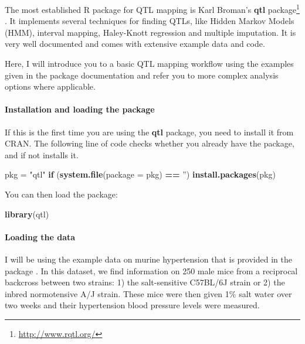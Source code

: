\documentclass[12pt,]{krantz}
\newenvironment{Shaded}{\begin{snugshade}}{\end{snugshade}}
\newcommand{\KeywordTok}[1]{\textcolor[rgb]{0.27,0.27,0.27}{\textbf{#1}}}
\newcommand{\DataTypeTok}[1]{\textcolor[rgb]{0.27,0.27,0.27}{#1}}
\newcommand{\StringTok}[1]{\textcolor[rgb]{0.5,0.5,0.5}{#1}}
\newcommand{\ControlFlowTok}[1]{\textcolor[rgb]{0.13,0.29,0.53}{\textbf{#1}}}
\newcommand{\OperatorTok}[1]{\textcolor[rgb]{0.81,0.36,0.00}{\textbf{#1}}}
\newcommand{\NormalTok}[1]{#1}
\let\oldparagraph\paragraph
\renewcommand{\paragraph}[1]{\oldparagraph{#1}\mbox{}}
\renewcommand{\href}[2]{#2\footnote{\url{#1}}}
\theoremstyle{definition}
\theoremstyle{definition}
\theoremstyle{definition}
\theoremstyle{remark}
\begin{document}
The most established R package for QTL mapping is Karl Broman's
\href{http://www.rqtl.org/}{\textbf{qtl} package}
\citep{R-qtl}. It implements several techniques for finding QTLs, like
Hidden Markov Models (HMM), interval mapping, Haley-Knott regression and
multiple imputation. It is very well documented and comes with extensive
example data and code.

Here, I will introduce you to a basic QTL mapping workflow using the
examples given in the package documentation and refer you to more
complex analysis options where applicable.

\paragraph{Installation and loading the
package}\label{installation-and-loading-the-package}

If this is the first time you are using the \textbf{qtl}
package, you need to install it from CRAN. The following line of code
checks whether you already have the package, and if not installs it.

\begin{Shaded}
\begin{Highlighting}[]
\NormalTok{pkg =}\StringTok{ "qtl"}
\ControlFlowTok{if}\NormalTok{ (}\KeywordTok{system.file}\NormalTok{(}\DataTypeTok{package =}\NormalTok{ pkg) }\OperatorTok{==}\StringTok{ ''}\NormalTok{) }\KeywordTok{install.packages}\NormalTok{(pkg)}
\end{Highlighting}
\end{Shaded}

You can then load the package:

\begin{Shaded}
\begin{Highlighting}[]
\KeywordTok{library}\NormalTok{(qtl)}
\end{Highlighting}
\end{Shaded}

\paragraph{Loading the data}\label{loading-the-data}

I will be using the example data on murine hypertension that is provided
in the package \citep{Sugiyama200170}. In this dataset, we find
information on 250 male mice from a reciprocal backcross between two
strains: 1) the salt-sensitive C57BL/6J strain or 2) the inbred
normotensive A/J strain. These mice were then given 1\% salt water over
two weeks and their hypertension blood pressure levels were measured.
\end{document}
